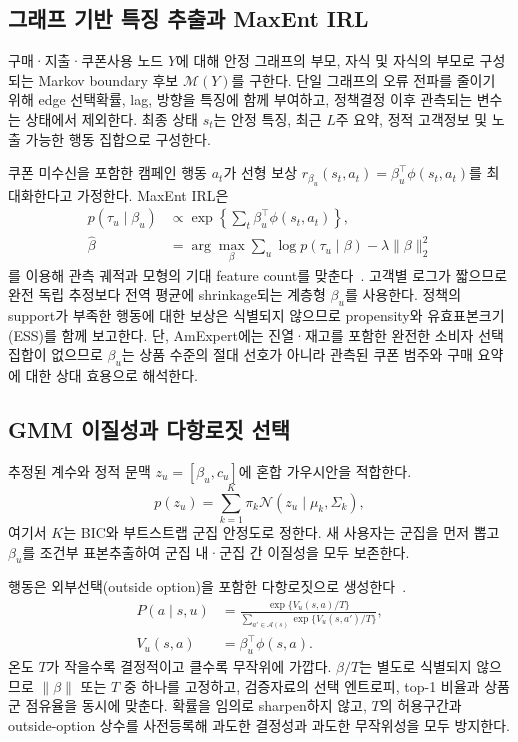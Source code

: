 \documentclass[11pt,twocolumn]{article}
\begin{document}
\subsection{그래프 기반 특징 추출과 MaxEnt IRL}
구매·지출·쿠폰사용 노드 $Y$에 대해 안정 그래프의 부모, 자식 및 자식의 부모로 구성되는
Markov boundary 후보 $\mathcal{M}(Y)$를 구한다. 단일 그래프의 오류 전파를 줄이기 위해
edge 선택확률, lag, 방향을 특징에 함께 부여하고, 정책결정 이후 관측되는 변수는 상태에서
제외한다. 최종 상태 $s_t$는 안정 특징, 최근 $L$주 요약, 정적 고객정보 및 노출 가능한
행동 집합으로 구성한다.

쿠폰 미수신을 포함한 캠페인 행동 $a_t$가 선형 보상
$r_{\beta_u}(s_t,a_t)=\beta_u^\top\phi(s_t,a_t)$를 최대화한다고 가정한다. MaxEnt IRL은
\begin{align*}
p(\tau_u\mid\beta_u)&\propto
\exp\!\left\{\sum_t\beta_u^\top\phi(s_t,a_t)\right\},\\
\hat\beta&=\arg\max_\beta\sum_u\log p(\tau_u\mid\beta)-\lambda\|\beta\|_2^2
\end{align*}
를 이용해 관측 궤적과 모형의 기대 feature count를 맞춘다~\cite{ziebart2008}. 고객별 로그가
짧으므로 완전 독립 추정보다 전역 평균에 shrinkage되는 계층형 $\beta_u$를 사용한다. 정책의
support가 부족한 행동에 대한 보상은 식별되지 않으므로 propensity와 유효표본크기(ESS)를
함께 보고한다. 단, AmExpert에는 진열·재고를 포함한 완전한 소비자 선택집합이 없으므로
$\beta_u$는 상품 수준의 절대 선호가 아니라 관측된 쿠폰 범주와 구매 요약에 대한 상대 효용으로
해석한다.

\subsection{GMM 이질성과 다항로짓 선택}
추정된 계수와 정적 문맥 $z_u=[\beta_u,c_u]$에 혼합 가우시안을 적합한다.
\[
p(z_u)=\sum_{k=1}^{K}\pi_k\mathcal{N}(z_u\mid\mu_k,\Sigma_k),
\]
여기서 $K$는 BIC와 부트스트랩 군집 안정도로 정한다. 새 사용자는 군집을 먼저 뽑고
$\beta_u$를 조건부 표본추출하여 군집 내·군집 간 이질성을 모두 보존한다.

행동은 외부선택(outside option)을 포함한 다항로짓으로 생성한다~\cite{mcfadden1974}.
\begin{align*}
P(a\mid s,u)&=\frac{\exp\{V_{u}(s,a)/T\}}
{\sum_{a'\in\mathcal{A}(s)}\exp\{V_u(s,a')/T\}},\\[-1mm]
V_u(s,a)&=\beta_u^\top\phi(s,a).
\end{align*}
온도 $T$가 작을수록 결정적이고 클수록 무작위에 가깝다. $\beta/T$는 별도로 식별되지 않으므로
$\|\beta\|$ 또는 $T$ 중 하나를 고정하고, 검증자료의 선택 엔트로피, top-1 비율과 상품군 점유율을
동시에 맞춘다. 확률을 임의로 sharpen하지 않고, $T$의 허용구간과 outside-option 상수를
사전등록해 과도한 결정성과 과도한 무작위성을 모두 방지한다.
\end{document}
